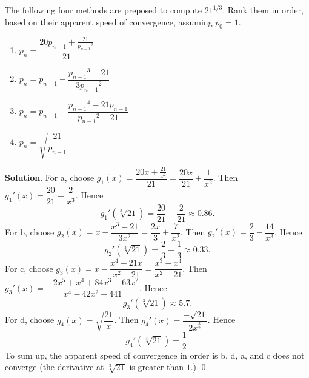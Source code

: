 \documentclass[11pt]{article}
\theoremstyle{break}
\numberwithin{equation}{theorem}
\begin{document}
\newpage
\begin{problem}\label{problem 3}
    The following four methods are preposed to compute $21^{1/3}$. Rank them in order, based on their apparent speed of convergence, assuming $p_0=1$.
    \begin{enumerate}
        \item $p_n = \dfrac{20p_{n-1} + \frac{21}{{p_{n-1}}^2}}{21}$
        \item $p_n = p_{n-1} - \dfrac{{p_{n-1}}^3-21}{3{p_{n-1}}^2}$
        \item $p_n = p_{n-1} - \dfrac{{p_{n-1}}^4 - 21p_{n-1}}{{p_{n-1}}^2-21}$
        \item $p_n=\sqrt{\dfrac{21}{p_{n-1}}}$
    \end{enumerate}
\end{problem}
\textbf{Solution}. For a, choose $g_1(x)=\dfrac{20x+\frac{21}{x^2}}{21}=\dfrac{20x}{21}+\dfrac{1}{x^2}$. Then ${g_1}'(x)=\dfrac{20}{21}-\dfrac{2}{x^3}$. Hence $${g_1}'(\sqrt[3]{21})=\dfrac{20}{21}-\dfrac{2}{21}\approx0.86.$$ For b, choose $g_2(x)=x-\dfrac{x^3-21}{3x^2}=\dfrac{2x}{3}+\dfrac{7}{x^2}$. Then ${g_2}'(x)=\dfrac{2}{3}-\dfrac{14}{x^3}$. Hence
$${g_2}'(\sqrt[3]{21})=\dfrac{2}{3}-\dfrac{1}{3}\approx0.33.$$
For c, choose ${g_3}(x)=x-\dfrac{x^4-21x}{x^2-21}=\dfrac{x^3-x^4}{x^2-21}$. Then ${g_3}'(x)=\dfrac{-2x^5+x^4+84x^3-63x^2}{x^4-42x^2+441}$. Hence $${g_3}'(\sqrt[3]{21})\approx5.7.$$ For d, choose ${g_4}(x)=\sqrt{\dfrac{21}{x}}$. Then ${g_4}'(x)=\dfrac{-\sqrt{21}}{2x^{\frac{3}{2}}}$. Hence $${g_4}'(\sqrt[3]{21})=\dfrac{1}{2}.$$ To sum up, the apparent speed of convergence in order is b, d, a, and c does not converge (the derivative at $\sqrt[3]{21}$ is greater than $1$.) \qed
\end{document}
